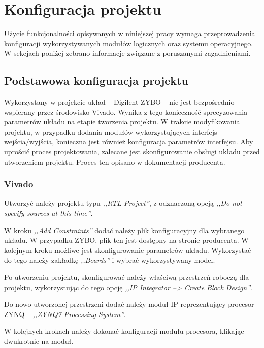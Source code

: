 \chapter{Konfiguracja projektu}
\label{cha:vivado-conf}

Użycie funkcjonalności opisywanych w niniejszej pracy wymaga przeprowadzenia konfiguracji wykorzystywanych modułów logicznych oraz systemu operacyjnego. W sekcjach poniżej zebrano informacje związane z poruszanymi zagadnieniami.

\section{Podstawowa konfiguracja projektu}

Wykorzystany w projekcie układ -- Digilent ZYBO -- nie jest bezpośrednio wspierany przez środowisko Vivado. Wynika z tego konieczność sprecyzowania parametrów układu na etapie tworzenia projektu. W trakcie modyfikowania projektu, w przypadku dodania modułów wykorzystujących interfejs wejścia/wyjścia, konieczna jest również konfiguracja parametrów interfejsu. Aby uprościć proces projektowania, zalecane jest skonfigurowanie obsługi układu przed utworzeniem projektu. Proces ten opisano w dokumentacji producenta. \cite{zybo-in-vivado}

\subsection{Vivado}
\label{sec:vivado-conf}
Utworzyć należy projektu typu \emph{,,RTL Project''}, z odznaczoną opcją \emph{,,Do not specify sources at this time''}.

W kroku \emph{,,Add Constraints''} dodać należy plik konfiguracyjny dla wybranego układu. W przypadku ZYBO, plik ten jest dostępny na stronie producenta. W kolejnym kroku możliwe jest skonfigurowanie parametrów układu. Wykorzystać do tego należy zakładkę \emph{,,Boards''} i wybrać wykorzystywany model.

Po utworzeniu projektu, skonfigurować należy właściwą przestrzeń roboczą dla projektu, wykorzystując do tego opcję \emph{,,IP Integrator --> Create Block Design''}.

Do nowo utworzonej przestrzeni dodać należy moduł IP reprezentujący procesor ZYNQ -- \emph{,,ZYNQ7 Processing System''}.

W kolejnych krokach należy dokonać konfiguracji modułu procesora, klikając dwukrotnie na moduł.

